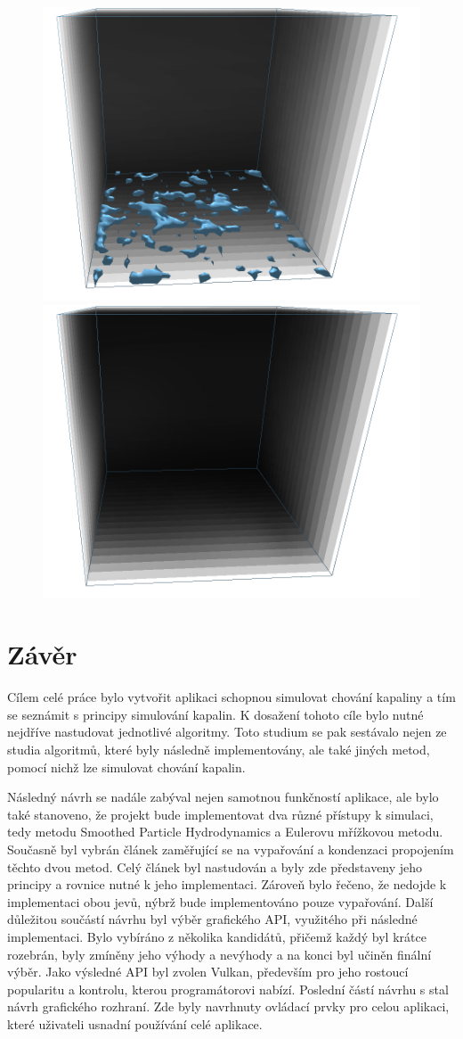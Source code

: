 \begin{figure}[h]
	\includegraphics[width=0.3\linewidth]{obrazky-figures/app/Evap07.jpg}
	\includegraphics[width=0.3\linewidth]{obrazky-figures/app/Evap08.jpg}\hfill
	\label{fig:SWE}
\end{figure}

\chapter{Závěr}
\label{chapter:zaver}

Cílem celé práce bylo vytvořit aplikaci schopnou simulovat chování kapaliny a tím se seznámit s principy simulování kapalin. K dosažení tohoto cíle bylo nutné nejdříve nastudovat jednotlivé algoritmy. Toto studium se pak sestávalo nejen ze studia algoritmů, které byly následně implementovány, ale také jiných metod, pomocí nichž lze simulovat chování kapalin.

Následný návrh se nadále zabýval nejen samotnou funkčností aplikace, ale bylo také stanoveno, že projekt bude implementovat dva různé přístupy k simulaci, tedy metodu Smoothed Particle Hydrodynamics a Eulerovu mřížkovou metodu. Současně byl vybrán článek \cite{Evap&Cond} zaměřující se na vypařování a kondenzaci propojením těchto dvou metod. Celý článek byl nastudován a byly zde představeny jeho principy a rovnice nutné k jeho implementaci. Zároveň bylo řečeno, že nedojde k implementaci obou jevů, nýbrž bude implementováno pouze vypařování. Další důležitou součástí návrhu byl výběr grafického API, využitého při následné implementaci. Bylo vybíráno z několika kandidátů, přičemž každý byl krátce rozebrán, byly zmíněny jeho výhody a nevýhody a na konci byl učiněn finální výběr. Jako výsledné API byl zvolen Vulkan, především pro jeho rostoucí popularitu a kontrolu, kterou programátorovi nabízí. Poslední částí návrhu s stal návrh grafického rozhraní. Zde byly navrhnuty ovládací prvky pro celou aplikaci, které uživateli usnadní používání celé aplikace.

